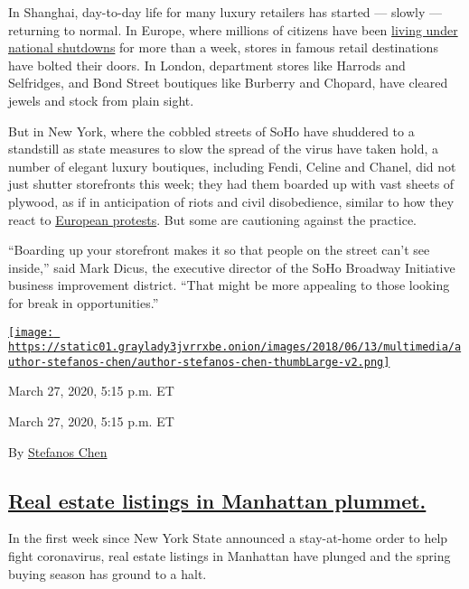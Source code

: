 In Shanghai, day-to-day life for many luxury retailers has started ---
slowly --- returning to normal. In Europe, where millions of citizens
have been
\href{https://www.nytimes3xbfgragh.onion/2020/03/17/world/europe/paris-coronavirus-lockdown.html}{living
under national shutdowns} for more than a week, stores in famous retail
destinations have bolted their doors. In London, department stores like
Harrods and Selfridges, and Bond Street boutiques like Burberry and
Chopard, have cleared jewels and stock from plain sight.

But in New York, where the cobbled streets of SoHo have shuddered to a
standstill as state measures to slow the spread of the virus have taken
hold, a number of elegant luxury boutiques, including Fendi, Celine and
Chanel, did not just shutter storefronts this week; they had them
boarded up with vast sheets of plywood, as if in anticipation of riots
and civil disobedience, similar to how they react to
\href{https://www.nytimes3xbfgragh.onion/2018/12/17/business/paris-yellow-vests-luxury-retail.html}{European
protests}. But some are cautioning against the practice.

``Boarding up your storefront makes it so that people on the street
can't see inside,'' said Mark Dicus, the executive director of the SoHo
Broadway Initiative business improvement district. ``That might be more
appealing to those looking for break in opportunities.''

\href{https://www.nytimes3xbfgragh.onion/by/stefanos-chen}{\texttt{[image: https://static01.graylady3jvrrxbe.onion/images/2018/06/13/multimedia/author-stefanos-chen/author-stefanos-chen-thumbLarge-v2.png]}}

March 27, 2020, 5:15 p.m. ET

March 27, 2020, 5:15 p.m. ET

By \href{https://www.nytimes3xbfgragh.onion/by/stefanos-chen}{Stefanos
Chen}

\hypertarget{real-estate-listings-in-manhattan-plummet}{%
\subsection{\texorpdfstring{\protect\hyperlink{real-estate-listings-in-manhattan-plummet}{Real
estate listings in Manhattan
plummet.}}{Real estate listings in Manhattan plummet.}}\label{real-estate-listings-in-manhattan-plummet}}

In the first week since New York State announced a stay-at-home order to
help fight coronavirus, real estate listings in Manhattan have plunged
and the spring buying season has ground to a halt.

